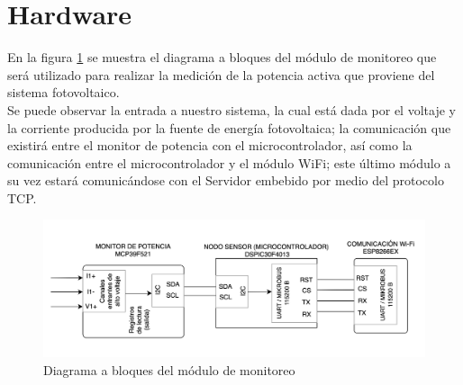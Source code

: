 \section{Hardware}
En la figura \ref{fig:circuito} se muestra el diagrama a bloques del módulo de monitoreo que será utilizado para realizar la medición de la potencia activa que proviene del sistema fotovoltaico. \\
Se puede observar la entrada a nuestro sistema, la cual está dada por el voltaje y la corriente producida por la fuente de energía fotovoltaica; la comunicación que existirá entre el monitor de potencia con el microcontrolador, así como la comunicación entre el microcontrolador y el módulo WiFi; este último módulo a su vez estará comunicándose con el Servidor embebido por medio del protocolo TCP.  
\\
\begin{figure}[H]
	\centering
	\includegraphics[width=1\textwidth]{Capitulo4/hardware/images/sistemaDigital.png}
	\caption{Diagrama a bloques del módulo de monitoreo}
	\label{fig:circuito}
\end{figure}

%